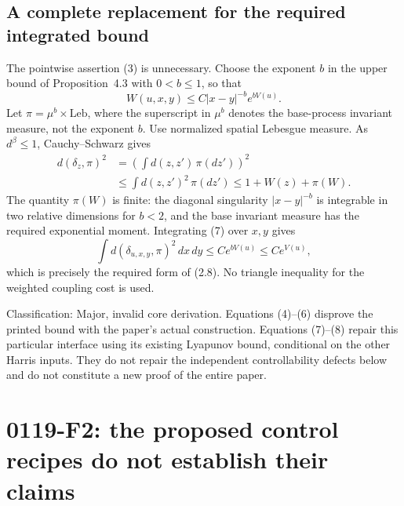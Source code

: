 \documentclass[10pt]{article}
\begin{document}
\subsection*{A complete replacement for the required integrated bound}
The pointwise assertion (3) is unnecessary. Choose the exponent \(b\) in the upper bound of Proposition 4.3 with \(0<b\le1\), so that \[W(u,x,y)\le C|x-y|^{-b}e^{bV(u)}.\] Let \(\pi=\mu^b\times\mathrm{Leb}\), where the superscript in \(\mu^b\) denotes the base-process invariant measure, not the exponent \(b\). Use normalized spatial Lebesgue measure. As \(d^\beta\le1\), Cauchy–Schwarz gives \[\begin{split}
 d(\delta_z,\pi)^2
 &=\left(\int d(z,z')\,\pi(dz')\right)^2\\
 &\le\int d(z,z')^2\,\pi(dz')
 \le1+W(z)+\pi(W).
\end{split}
 \tag{7}\] The quantity \(\pi(W)\) is finite: the diagonal singularity \(|x-y|^{-b}\) is integrable in two relative dimensions for \(b<2\), and the base invariant measure has the required exponential moment. Integrating (7) over \(x,y\) gives \[\int d(\delta_{u,x,y},\pi)^2\,dx\,dy
 \le Ce^{bV(u)}\le Ce^{V(u)},
 \tag{8}\] which is precisely the required form of (2.8). No triangle inequality for the weighted coupling cost is used.\par
Classification: Major, invalid core derivation. Equations (4)–(6) disprove the printed bound with the paper’s actual construction. Equations (7)–(8) repair this particular interface using its existing Lyapunov bound, conditional on the other Harris inputs. They do not repair the independent controllability defects below and do not constitute a new proof of the entire paper.\par
\section*{0119-F2: the proposed control recipes do not establish their claims}
\end{document}
